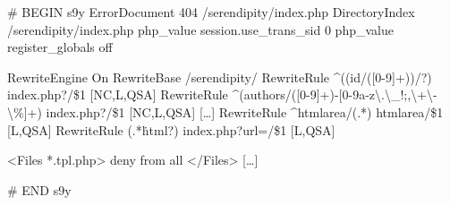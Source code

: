 \begin{ospcode}
# BEGIN s9y
ErrorDocument 404 /serendipity/index.php
DirectoryIndex /serendipity/index.php
php_value session.use_trans_sid 0
php_value register_globals off

RewriteEngine On
RewriteBase /serendipity/
RewriteRule ^((id/([0-9]+))/?) index.php?/\$1 [NC,L,QSA]
RewriteRule ^(authors/([0-9]+)-[0-9a-z{\textbackslash}.{\textbackslash}_!;,{\textbackslash}+{\textbackslash}-{\textbackslash}\%]+) 
  index.php?/\$1 [NC,L,QSA]
[\ldots]
RewriteRule ^htmlarea/(.*) htmlarea/\$1 [L,QSA]
RewriteRule (.*\.html?) index.php?url=/\$1 [L,QSA]

<Files *.tpl.php>
    deny from all
</Files>
[\ldots]

# END s9y
\end{ospcode}
